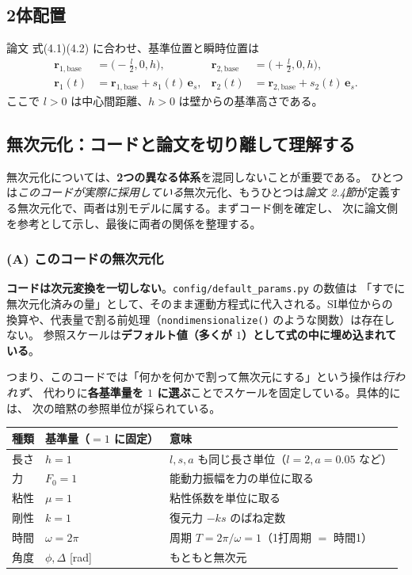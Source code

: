 \documentclass[11pt,a4paper]{article}
\newcommand{\es}{\bm{e}_{s}}
\newcommand{\rv}{\bm{r}}
\begin{document}
\subsection{2体配置}

論文 式(4.1)(4.2) に合わせ、基準位置と瞬時位置は
\begin{align}
\rv_{1,\mathrm{base}}&=\Big(-\tfrac{l}{2},0,h\Big), &
\rv_{2,\mathrm{base}}&=\Big(+\tfrac{l}{2},0,h\Big),\\[4pt]
\rv_1(t)&=\rv_{1,\mathrm{base}}+s_1(t)\,\es, &
\rv_2(t)&=\rv_{2,\mathrm{base}}+s_2(t)\,\es.
\end{align}
ここで $l>0$ は中心間距離、$h>0$ は壁からの基準高さである。

\subsection{無次元化：コードと論文を切り離して理解する}\label{sec:nondim}

無次元化については、\textbf{2つの異なる体系}を混同しないことが重要である。
ひとつは\emph{このコードが実際に採用している}無次元化、もうひとつは\emph{論文
2.4節}が定義する無次元化で、両者は別モデルに属する。まずコード側を確定し、
次に論文側を参考として示し、最後に両者の関係を整理する。

\subsubsection{(A) このコードの無次元化}

\begin{keybox}
\textbf{コードは次元変換を一切しない}。\texttt{config/default\_params.py} の数値は
「すでに無次元化済みの量」として、そのまま運動方程式に代入される。SI単位からの
換算や、代表量で割る前処理（\texttt{nondimensionalize()} のような関数）は存在しない。
参照スケールは\textbf{デフォルト値（多くが $1$）として式の中に埋め込まれている}。
\end{keybox}

つまり、このコードでは「何かを何かで割って無次元にする」という操作は\emph{行われず}、
代わりに\textbf{各基準量を $1$ に選ぶ}ことでスケールを固定している。具体的には、
次の暗黙の参照単位が採られている。

\begin{table}[h]
\centering\small
\begin{tabularx}{\linewidth}{l l X}
\toprule
種類 & 基準量（$=1$ に固定） & 意味 \\
\midrule
長さ & $h=1$ & $l,s,a$ も同じ長さ単位（$l=2,a=0.05$ など） \\
力 & $F_0=1$ & 能動力振幅を力の単位に取る \\
粘性 & $\mu=1$ & 粘性係数を単位に取る \\
剛性 & $k=1$ & 復元力 $-ks$ のばね定数 \\
時間 & $\omega=2\pi$ & 周期 $T=2\pi/\omega=1$（1打周期 $=$ 時間1） \\
角度 & $\phi,\Delta$ [rad] & もともと無次元 \\
\bottomrule
\end{tabularx}
\end{table}
\end{document}
